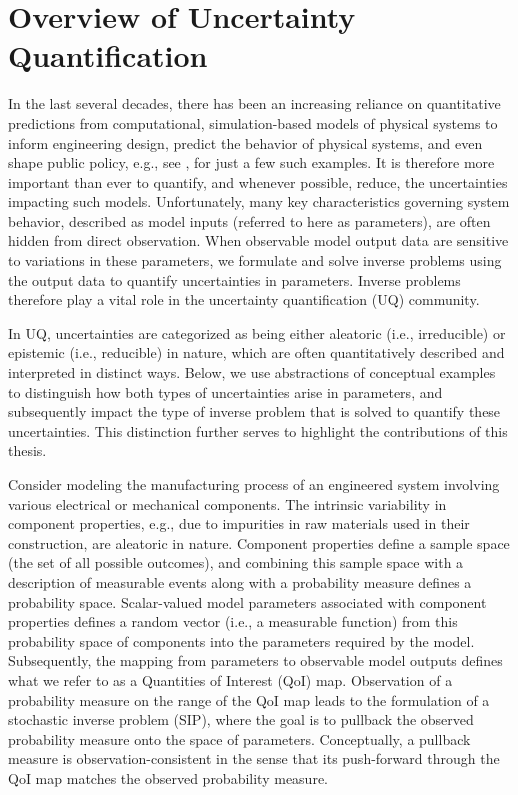 \section{Overview of Uncertainty Quantification}\label{sec:intro}

In the last several decades, there has been an increasing reliance on quantitative predictions from computational, simulation-based models of physical systems to inform engineering design, predict the behavior of physical systems, and even shape public policy, e.g., see \cite{VO14, VO15, BDMV, HV}, for just a few such examples.
It is therefore more important than ever to quantify, and whenever possible, reduce, the uncertainties impacting such models.
Unfortunately, many key characteristics governing system behavior, described as model inputs (referred to here as parameters), are often hidden from direct observation.
When observable model output data are sensitive to variations in these parameters, we formulate and solve inverse problems using the output data to quantify uncertainties in parameters.
Inverse problems therefore play a vital role in the uncertainty quantification (UQ) community.

In UQ, uncertainties are categorized as being either aleatoric (i.e., irreducible) or epistemic (i.e., reducible) in nature, which are often quantitatively described and interpreted in distinct ways.
Below, we use abstractions of conceptual examples to distinguish how both types of uncertainties arise in parameters, and subsequently impact the type of inverse problem that is solved to quantify these uncertainties.
This distinction further serves to highlight the contributions of this thesis.

Consider modeling the manufacturing process of an engineered system involving various electrical or mechanical components.
The intrinsic variability in component properties, e.g., due to impurities in raw materials used in their construction, are aleatoric in nature.
Component properties define a sample space (the set of all possible outcomes), and combining this sample space with a description of measurable events along with a probability measure defines a probability space.
Scalar-valued model parameters associated with component properties defines a random vector (i.e., a measurable function) from this probability space of components into the parameters required by the model.
Subsequently, the mapping from parameters to observable model outputs defines what we refer to as a Quantities of Interest (QoI) map.
Observation of a probability measure on the range of the QoI map leads to the formulation of a stochastic inverse problem (SIP), where the goal is to pullback the observed probability measure onto the space of parameters.
Conceptually, a pullback measure is observation-consistent in the sense that its push-forward through the QoI map matches the observed probability measure.

